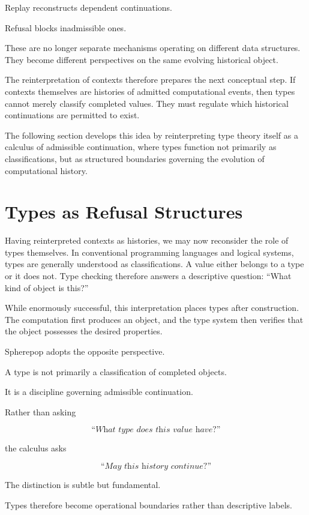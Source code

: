 \documentclass[12pt,oneside]{article}
\theoremstyle{definition}
\theoremstyle{remark}
\begin{document}
Replay reconstructs dependent continuations.

Refusal blocks inadmissible ones.

These are no longer separate mechanisms operating on different data
structures. They become different perspectives on the same evolving historical
object.

The reinterpretation of contexts therefore prepares the next conceptual step.
If contexts themselves are histories of admitted computational events, then
types cannot merely classify completed values. They must regulate which
historical continuations are permitted to exist.

The following section develops this idea by reinterpreting type theory itself
as a calculus of admissible continuation, where types function not primarily
as classifications, but as structured boundaries governing the evolution of
computational history.

\section{Types as Refusal Structures}

Having reinterpreted contexts as histories, we may now reconsider the role of
types themselves. In conventional programming languages and logical systems,
types are generally understood as classifications. A value either belongs to a
type or it does not. Type checking therefore answers a descriptive question:
``What kind of object is this?''

While enormously successful, this interpretation places types after
construction. The computation first produces an object, and the type system
then verifies that the object possesses the desired properties.

Spherepop adopts the opposite perspective.

A type is not primarily a classification of completed objects.

It is a discipline governing admissible continuation.

Rather than asking

\[
\textit{``What type does this value have?''}
\]

the calculus asks

\[
\textit{``May this history continue?''}
\]

The distinction is subtle but fundamental.

Types therefore become operational boundaries rather than descriptive labels.
\end{document}
